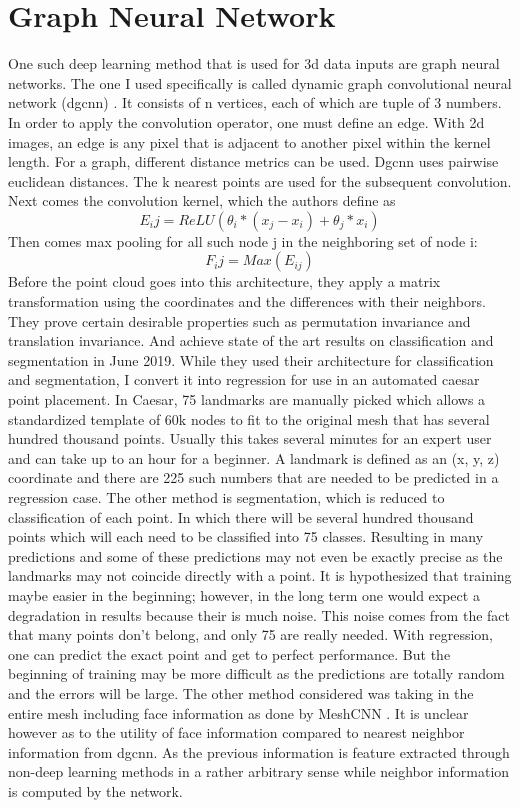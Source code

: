 \section{Graph Neural Network}
One such deep learning method that is used for 3d data inputs are graph neural networks. The one I used specifically is called dynamic graph convolutional neural network (dgcnn) \cite{DBLP:journals/corr/abs-1801-07829}. It consists of n vertices, each of which are tuple of 3 numbers. In order to apply the convolution operator, one must define an edge. With 2d images, an edge is any pixel that is adjacent to another pixel within the kernel length. For a graph, different distance metrics can be used. Dgcnn uses pairwise euclidean distances. The k nearest points are used for the subsequent convolution. Next comes the convolution kernel, which the authors define as
\begin{equation}
	E_ij = ReLU(\theta_i * (x_j - x_i) + \theta_j * x_i)
\end{equation}
Then comes max pooling for all such node j in the neighboring set of node i:
\begin{equation}
F_ij = Max(E_{ij})
\end{equation}
Before the point cloud goes into this architecture, they apply a matrix transformation using the coordinates and the differences with their neighbors.
They prove certain desirable properties such as permutation invariance and translation invariance. And achieve state of the art results on classification and segmentation in June 2019.
While they used their architecture for classification and segmentation, I convert it into regression for use in an automated caesar point placement. In Caesar, 75 landmarks are manually picked which allows a standardized template of 60k nodes to fit to the original mesh that has several hundred thousand points. Usually this takes several minutes for an expert user and can take up to an hour for a beginner.
A landmark is defined as an (x, y, z) coordinate and there are 225 such numbers that are needed to be predicted in a regression case. The other method is segmentation, which is reduced to classification of each point. In which there will be several hundred thousand points which will each need to be classified into 75 classes. Resulting in many predictions and some of these predictions may not even be exactly precise as the landmarks may not coincide directly with a point. It is hypothesized that training maybe easier in the beginning; however, in the long term one would expect a degradation in results because their is much noise. This noise comes from the fact that many points don't belong, and only 75 are really needed. With regression, one can predict the exact point and get to perfect performance. But the beginning of training may be more difficult as the predictions are totally random and the errors will be large.
The other method considered was taking in the entire mesh including face information as done by MeshCNN \cite{hanocka2019meshcnn}. It is unclear however as to the utility of face information compared to nearest neighbor information from dgcnn. As the previous information is feature extracted through non-deep learning methods in a rather arbitrary sense while neighbor information is computed by the network.

